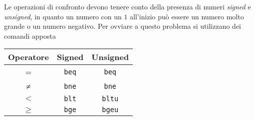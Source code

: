 \documentclass[a4paper,12pt]{article}
\theoremstyle{break}
\newcommand{\code}[1]{\texttt{#1}}
\numberwithin{equation}{section}
\begin{document}
Le operazioni di confronto devono tenere conto della presenza di numeri \textit{signed} e \textit{unsigned}, in quanto un numero con un \(1\) all'inizio può essere un numero molto grande o un numero negativo. Per ovviare a questo problema si utilizzano dei comandi apposta
\begin{center}
    \begin{tabular}{|c|c|c|}
        \hline
        Operatore & Signed & Unsigned \\
        \hline
        = & \code{beq} & \code{beq} \\
        ≠ & \code{bne} & \code{bne} \\
        \(<\) & \code{blt} & \code{bltu} \\
        \(\geq\) & \code{bge} & \code{bgeu} \\
        \hline
    \end{tabular}
\end{center}
\end{document}
